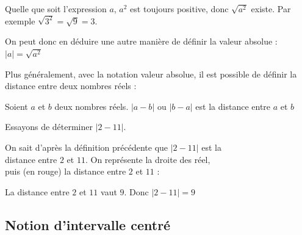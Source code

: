 \begin{rem}{}{}
Quelle que soit l'expression $a$, $a^2$ est toujours positive, donc $\sqrt{a^2}$ existe. Par exemple $\sqrt{3^2} = \sqrt{9} = 3$.

\noindent On peut donc en déduire une autre manière de définir la valeur absolue : \quad $|a| = \sqrt{a^2}$
\end{rem}

\bigskip
\noindent Plus généralement, avec la notation valeur absolue, il est possible de définir la distance entre deux nombres réels :

\begin{prop}{}{}
Soient $a$ et $b$ deux nombres réels. $|a-b|$ ou $|b-a|$ est la distance entre $a$ et $b$ 
\end{prop}

\smallskip
\begin{ex}{}{}
Essayons de déterminer $|2-11|$.\medskip 

\noindent On sait d'après la définition précédente que $|2-11|$ est la \\distance entre $2$ et $11$. On représente la droite des réel, \\puis (en rouge) la distance entre $2$ et $11$ :
\\
\vspace{-19mm}
\begin{flushright}
\end{flushright}

\noindent La distance entre $2$ et $11$ vaut $9$. Donc $|2-11| = 9$
\end{ex}

\subsection{Notion d'intervalle centré}

